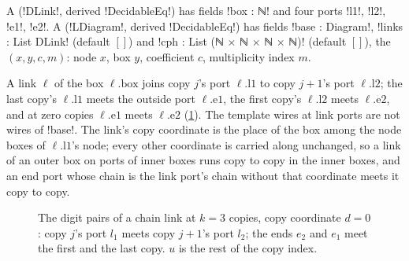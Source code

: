 \begin{definition}\label{def:lean-sym-ldiagram}
A  (\lean!DLink!, derived \lean!DecidableEq!) has fields \lean!box : ℕ! and four ports \lean!l1!, \lean!l2!, \lean!e1!, \lean!e2!. A  (\lean!LDiagram!, derived \lean!DecidableEq!) has fields \lean!base : Diagram!, \lean!links : List DLink! (default $[]$) and \lean!cph : List (ℕ × ℕ × ℕ × ℕ)! (default $[]$), the  $(x,y,c,m)$: node $x$, box $y$, coefficient $c$, multiplicity index $m$.
\end{definition}

A link $\ell$ of the box $\ell.\mathrm{box}$ joins copy $j$'s port $\ell.\mathrm{l1}$ to copy $j+1$'s port $\ell.\mathrm{l2}$; the last copy's $\ell.\mathrm{l1}$ meets the outside port $\ell.\mathrm{e1}$, the first copy's $\ell.\mathrm{l2}$ meets $\ell.\mathrm{e2}$, and at zero copies $\ell.\mathrm{e1}$ meets $\ell.\mathrm{e2}$ (\cref{fig:lean-sym-link}). The template wires at link ports are not wires of \lean!base!. The link's copy coordinate is the place of the box among the node boxes of $\ell.\mathrm{l1}$'s node; every other coordinate is carried along unchanged, so a link of an outer box on ports of inner boxes runs copy to copy in the inner boxes, and an end port whose chain is the link port's chain without that coordinate meets it copy to copy.

\begin{figure}[H]
\centering
{}
\caption{The digit pairs of a chain link at $k=3$ copies, copy coordinate $d=0$: copy $j$'s port $l_1$ meets copy $j+1$'s port $l_2$; the ends $e_2$ and $e_1$ meet the first and the last copy. $u$ is the rest of the copy index.}\label{fig:lean-sym-link}
\end{figure}

